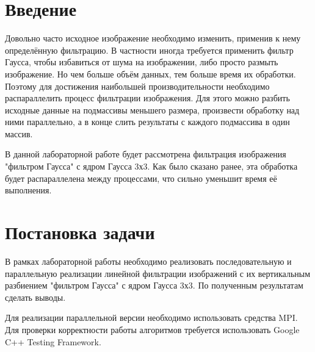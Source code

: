 \documentclass{report}
\begin{document}
\setcounter{page}{2}

\tableofcontents
\newpage

\section*{Введение}
Довольно часто исходное изображение необходимо изменить, применив к нему определённую фильтрацию. В частности иногда требуется применить фильтр Гаусса, чтобы избавиться от шума на изображении, либо просто размыть изображение. Но чем больше объём данных, тем больше время их обработки. Поэтому для достижения наибольшей производительности необходимо распараллелить процесс фильтрации изображения. Для этого можно разбить исходные данные на подмассивы меньшего размера, произвести обработку над ними параллельно, а в конце слить результаты с каждого подмассива в один массив.
\par В данной лабораторной работе будет рассмотрена фильтрация изображения "фильтром Гаусса" с ядром Гаусса 3х3. Как было сказано ранее, эта обработка будет распараллелена между процессами, что сильно уменьшит время её выполнения.
\newpage

\section*{Постановка задачи}
В рамках лабораторной работы необходимо реализовать последовательную и параллельную реализации линейной фильтрации изображений с их вертикальным разбиением "фильтром Гаусса" с ядром Гаусса 3х3. По полученным результатам сделать выводы.
\par Для реализации параллельной версии необходимо использовать средства MPI. Для проверки корректности работы алгоритмов требуется использовать Google C++ Testing Framework.
\newpage

\end{document}

